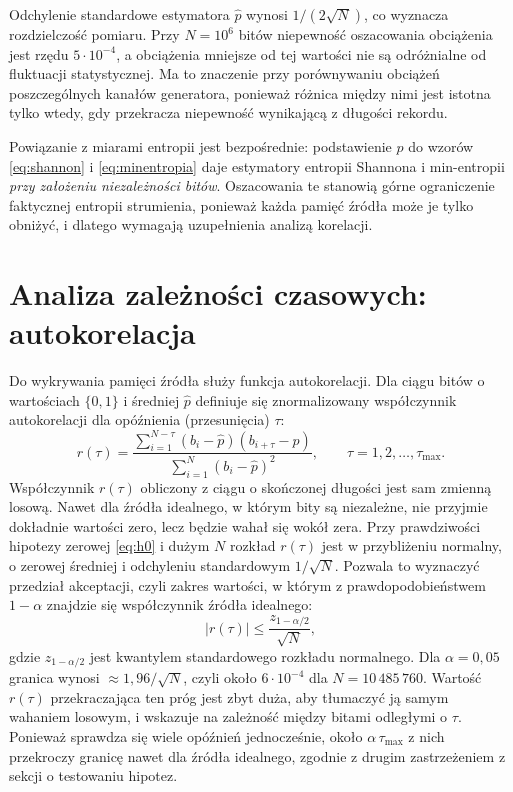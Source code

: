 Odchylenie standardowe estymatora $\hat{p}$ wynosi $1/(2\sqrt{N})$, co
wyznacza rozdzielczość pomiaru. Przy $N = 10^6$ bitów niepewność oszacowania
obciążenia jest rzędu $5\cdot 10^{-4}$, a obciążenia mniejsze od tej wartości
nie są odróżnialne od fluktuacji statystycznej. Ma to znaczenie przy
porównywaniu obciążeń poszczególnych kanałów generatora, ponieważ różnica
między nimi jest istotna tylko wtedy, gdy przekracza niepewność wynikającą
z długości rekordu.

Powiązanie z miarami entropii jest bezpośrednie: podstawienie $\hat{p}$ do
wzorów \eqref{eq:shannon} i \eqref{eq:minentropia} daje estymatory entropii
Shannona i min-entropii \emph{przy założeniu niezależności bitów}.
Oszacowania te stanowią górne ograniczenie faktycznej entropii strumienia,
ponieważ każda pamięć źródła może je tylko obniżyć, i dlatego wymagają
uzupełnienia analizą korelacji.

\section{Analiza zależności czasowych: autokorelacja}

Do wykrywania pamięci źródła służy funkcja autokorelacji. Dla ciągu bitów
o wartościach $\{0,1\}$ i średniej $\hat{p}$ definiuje się znormalizowany
współczynnik autokorelacji dla opóźnienia (przesunięcia) $\tau$:
%
\begin{equation}
  r(\tau) = \frac{\displaystyle\sum_{i=1}^{N-\tau}(b_i - \hat{p})(b_{i+\tau} - \hat{p})}
                 {\displaystyle\sum_{i=1}^{N}(b_i - \hat{p})^2},
  \qquad \tau = 1,2,\dots,\tau_{\max}.
  \label{eq:autokorelacja}
\end{equation}
%
Współczynnik $r(\tau)$ obliczony z ciągu o skończonej długości jest sam
zmienną losową. Nawet dla źródła idealnego, w którym bity są niezależne, nie
przyjmie dokładnie wartości zero, lecz będzie wahał się wokół zera. Przy
prawdziwości hipotezy zerowej \eqref{eq:h0} i dużym $N$ rozkład $r(\tau)$ jest
w przybliżeniu normalny, o zerowej średniej i odchyleniu standardowym
$1/\sqrt{N}$. Pozwala to wyznaczyć przedział akceptacji, czyli zakres wartości,
w którym z prawdopodobieństwem $1-\alpha$ znajdzie się współczynnik źródła
idealnego:
%
\begin{equation}
  |r(\tau)| \le \frac{z_{1-\alpha/2}}{\sqrt{N}} ,
  \label{eq:ci-autokorelacja}
\end{equation}
%
gdzie $z_{1-\alpha/2}$ jest kwantylem standardowego rozkładu normalnego. Dla
$\alpha = 0{,}05$ granica wynosi $\approx 1{,}96/\sqrt{N}$, czyli około
$6\cdot 10^{-4}$ dla $N = 10\,485\,760$. Wartość $r(\tau)$ przekraczająca ten
próg jest zbyt duża, aby tłumaczyć ją samym wahaniem losowym, i wskazuje na
zależność między bitami odległymi o $\tau$. Ponieważ sprawdza się wiele
opóźnień jednocześnie, około $\alpha\,\tau_{\max}$ z nich przekroczy granicę
nawet dla źródła idealnego, zgodnie z drugim zastrzeżeniem z sekcji
o testowaniu hipotez.

